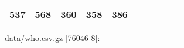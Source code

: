 \documentclass[]{article}
\newenvironment{Shaded}{\begin{snugshade}}{\end{snugshade}}
\newcommand{\StringTok}[1]{\textcolor[rgb]{0.31,0.60,0.02}{#1}}
\newcommand{\SpecialStringTok}[1]{\textcolor[rgb]{0.31,0.60,0.02}{#1}}
\newcommand{\VariableTok}[1]{\textcolor[rgb]{0.00,0.00,0.00}{#1}}
\newcommand{\AttributeTok}[1]{\textcolor[rgb]{0.77,0.63,0.00}{#1}}
\newcommand{\NormalTok}[1]{#1}
\begin{document}
\begin{longtable}[]{@{}lllrrrrrrr@{}}
\begin{minipage}[t]{0.09\columnwidth}
537\strut
\end{minipage} & \begin{minipage}[t]{0.09\columnwidth}\raggedleft\strut
568\strut
\end{minipage} & \begin{minipage}[t]{0.09\columnwidth}\raggedleft\strut
360\strut
\end{minipage} & \begin{minipage}[t]{0.09\columnwidth}\raggedleft\strut
358\strut
\end{minipage} & \begin{minipage}[t]{0.09\columnwidth}\raggedleft\strut
386\strut
\end{minipage}\tabularnewline
\bottomrule
\end{longtable}

\begin{Shaded}
\end{Shaded}

data/who.csv.gz {[}76046 8{]}:
\end{document}
